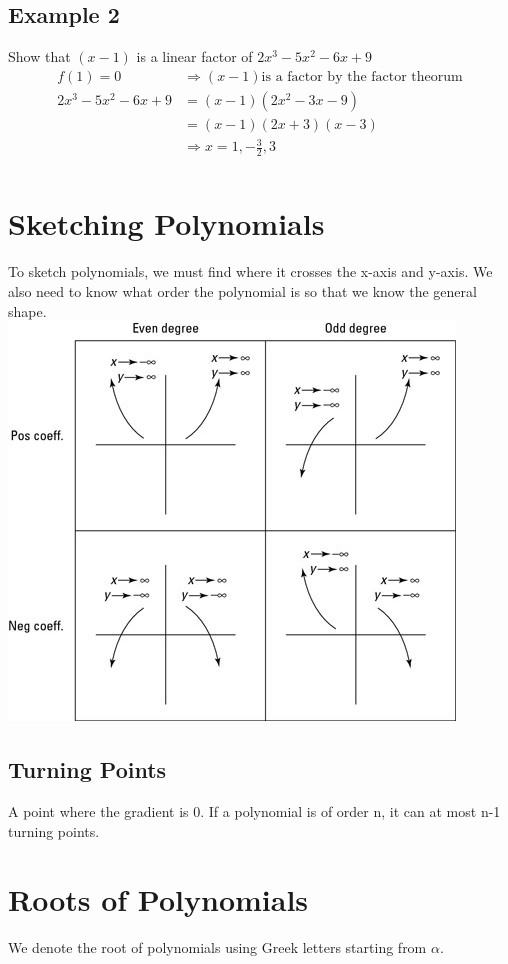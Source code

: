 \documentclass[a4paper,12pt]{article}
\begin{document}
\subsection*{Example 2}
Show that $(x-1)$ is a linear factor of $2x^3 - 5x^2 - 6x + 9$ \\ 
\begin{align*}
f(1) = 0 & \Rightarrow (x-1) \text{is a factor by the factor theorum} \\
2x^3 - 5x^2 - 6x + 9 & = (x-1)(2x^2-3x-9) \\
& = (x-1)(2x+3)(x-3) \\
& \Rightarrow x = 1, -\frac{3}{2}, 3 \\
\end{align*}
\section*{Sketching Polynomials}
To sketch polynomials, we must find where it crosses the x-axis and y-axis. We also need to know what order the polynomial is so that we know the general shape.  \\
\includegraphics[scale=0.7]{Graphs}
\subsection*{Turning Points}
A point where the gradient is 0. If a polynomial is of order n, it can at most n-1 turning points. 

\section*{Roots of Polynomials}
We denote the root of polynomials using Greek letters starting from $\alpha$.
\end{document}
